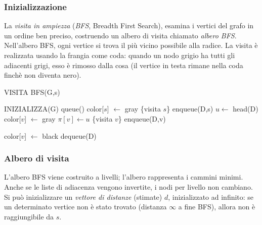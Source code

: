 \documentclass[11pt]{book}
\begin{document}
\subsubsection{Inizializzazione}
La \textit{visita in ampiezza} (\textit{BFS}, Breadth First Search), esamina i vertici del grafo in un ordine ben preciso,
costruendo un albero di visita chiamato \textit{albero BFS}. Nell'albero BFS, ogni vertice si trova il più vicino possibile 
alla radice. La visita è realizzata usando la frangia come coda: quando un nodo grigio ha tutti gli adiacenti grigi, esso 
è rimosso dalla cosa (il vertice in testa rimane nella coda finchè non diventa nero).
\begin{algorithm}[h]
    \caption{VISITA BFS(G,s)}
    \begin{algorithmic}
        \State INIZIALIZZA(G)
        \State queue() 
        \State color[$s$] $\gets$ gray
        \State \{visita $s$\}
        \State enqueue(D,s)
        \State $u \gets$ head(D)
            \State color[$v$] $\gets$ gray
            \State $\pi[v] \gets u$
            \State \{visita $v$\}
            \State enqueue(D,v)
    \end{algorithmic}
\end{algorithm}
\begin{algorithm}[h]
    \begin{algorithmic}
        \Else
            \State color[$v$] $\gets$ black
            \State dequeue(D)
        \EndIf
    \EndWhile
    \end{algorithmic}
\end{algorithm}
\subsubsection{Albero di visita}
L'albero BFS viene costruito a livelli; l'albero rappresenta i cammini minimi. Anche se le liste di adiacenza vengono 
invertite, i nodi per livello non cambiano.
Si può inizializzare un \textit{vettore di distanze} (stimate) $d$, inizializzato ad infinito: se un determinato vertice non
è stato trovato (distanza $\infty$ a fine BFS), allora non è raggiungibile da $s$.
\end{document}
